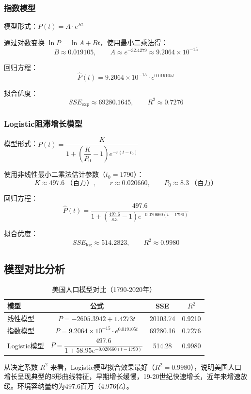 \documentclass{article}
\begin{document}
	\subsubsection{指数模型}
	模型形式：$P(t) = A \cdot e^{B t}$
	
	通过对数变换 $\ln P = \ln A + B t$，使用最小二乘法得：
	\[
	B \approx 0.019105,\qquad A \approx e^{-32.4279} \approx 9.2064 \times 10^{-15}
	\]
	
	回归方程：
	\[
	\hat{P}(t) = 9.2064 \times 10^{-15} \cdot e^{0.019105 t}
	\]
	
	拟合优度：
	\[
	SSE_{\text{exp}} \approx 69280.1645,\qquad R^2 \approx 0.7276
	\]
	
	\subsubsection{Logistic阻滞增长模型}
	模型形式：\( P(t) = \dfrac{K}{1 + \left(\dfrac{K}{P_0} - 1\right)e^{-r(t-t_0)}} \)
	
	使用非线性最小二乘法估计参数（$t_0 = 1790$）：
	\[
	K \approx 497.6\ \text{（百万）},\qquad r \approx 0.020660,\qquad P_0 \approx 8.3\ \text{（百万）}
	\]
	
	回归方程：
	\[
	\hat{P}(t) = \frac{497.6}{1 + \left(\frac{497.6}{8.3} - 1\right)e^{-0.020660(t-1790)}}
	\]
	
	拟合优度：
	\[
	SSE_{\text{log}} \approx 514.2823,\qquad R^2 \approx 0.9980
	\]
	
	\subsection{模型对比分析}
	
	\begin{table}[htbp]
		\centering
		\caption{美国人口模型对比（1790-2020年）}
		\renewcommand{\arraystretch}{2}
		\begin{tabular}{lccc}
			\toprule
			模型 & 公式 & SSE & $R^2$ \\
			\midrule
			线性模型 & $P = -2605.3942 + 1.4273t$ & 20103.74 & 0.9210 \\
			指数模型 & $P = 9.2064\times10^{-15} \cdot e^{0.019105t}$ & 69280.16 & 0.7276 \\
			Logistic模型 & $P = \dfrac{497.6}{1 + 58.95e^{-0.020660(t-1790)}}$ & 514.28 & 0.9980 \\
			\bottomrule
		\end{tabular}
	\end{table}
	
	从决定系数 $R^2$ 来看，Logistic模型拟合效果最好（$R^2 = 0.9980$），说明美国人口增长呈现典型的S形曲线特征，早期增长缓慢，19-20世纪快速增长，近年来增速放缓。环境容纳量约为497.6百万（4.976亿）。
	
\end{document}
